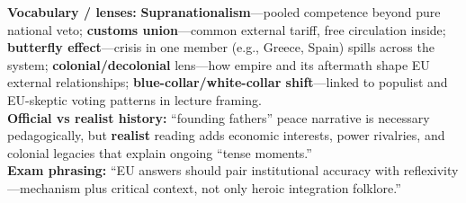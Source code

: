\documentclass[10pt,a4paper]{article}
\begin{document}
{\textbf{Vocabulary / lenses:} \textbf{Supranationalism}---pooled competence beyond pure national veto; \textbf{customs union}---common external tariff, free circulation inside; \textbf{butterfly effect}---crisis in one member (e.g., Greece, Spain) spills across the system; \textbf{colonial/decolonial} lens---how empire and its aftermath shape EU external relationships; \textbf{blue-collar/white-collar shift}---linked to populist and EU-skeptic voting patterns in lecture framing.\\
\textbf{Official vs realist history:} ``founding fathers'' peace narrative is necessary pedagogically, but \textbf{realist} reading adds economic interests, power rivalries, and colonial legacies that explain ongoing ``tense moments.''\\
\textbf{Exam phrasing:} ``EU answers should pair institutional accuracy with reflexivity---mechanism plus critical context, not only heroic integration folklore.''
}
\end{document}
